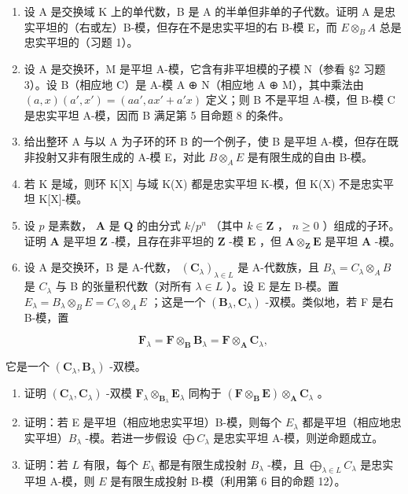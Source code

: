 \begin{enumerate}
\def\labelenumi{\arabic{enumi}.}
\setcounter{enumi}{3}
\item
设 A 是交换域 K 上的单代数，B 是 A 的半单但非单的子代数。证明 A 是忠实平坦的（右或左）B-模，但存在不是忠实平坦的右 B-模 E，而 \(E \otimes_{B} A\) 总是忠实平坦的（习题 1）。
\item
设 A 是交换环，M 是平坦 A-模，它含有非平坦模的子模 N（参看 §2 习题 3）。设 B（相应地 C）是 A-模 A ⊕ N（相应地 A ⊕ M），其中乘法由 \((a, x)(a', x') = (aa', ax' + a'x)\) 定义；则 B 不是平坦 A-模，但 B-模 C 是忠实平坦 A-模，因而 B 满足第 5 目命题 8 的条件。
\item
给出整环 A 与以 A 为子环的环 B 的一个例子，使 B 是平坦 A-模，但存在既非投射又非有限生成的 A-模 E，对此 \(B \otimes_{A} E\) 是有限生成的自由 B-模。
\item
若 K 是域，则环 K{[}X{]} 与域 K(X) 都是忠实平坦 K-模，但 K(X) 不是忠实平坦 K{[}X{]}-模。
\item
设 \(p\) 是素数， \(\mathbf{A}\) 是 \(\mathbf{Q}\) 的由分式 \(k / p^n\) （其中 \(k \in \mathbf{Z}\) ， \(n \geqslant 0\) ）组成的子环。证明 \(\mathbf{A}\) 是平坦 \(\mathbf{Z}\) -模，且存在非平坦的 \(\mathbf{Z}\) -模 \(\mathbf{E}\) ，但 \(\mathbf{A} \otimes_{\mathbf{Z}} \mathbf{E}\) 是平坦 \(\mathbf{A}\) -模。
\item
设 A 是交换环，B 是 A-代数， \((\mathbf{C}_{\lambda})_{\lambda \in L}\) 是 A-代数族，且 \(B_{\lambda} = C_{\lambda} \otimes_{A} B\) 是 \(C_{\lambda}\) 与 B 的张量积代数（对所有 \(\lambda \in L\) ）。设 E 是左 B-模。置 \(E_{\lambda} = B_{\lambda} \otimes_{B} E = C_{\lambda} \otimes_{A} E\) ；这是一个 \((\mathbf{B}_{\lambda}, \mathbf{C}_{\lambda})\) -双模。类似地，若 F 是右 B-模，置
\end{enumerate}

\[
\mathbf {F} _ {\lambda} = \mathbf {F} \otimes_ {\mathbf {B}} \mathbf {B} _ {\lambda} = \mathbf {F} \otimes_ {\mathbf {A}} \mathbf {C} _ {\lambda},
\]

它是一个 \((\mathbf{C}_{\lambda},\mathbf{B}_{\lambda})\) -双模。

\begin{enumerate}
\def\labelenumi{(\alph{enumi})}
\item
证明 \((\mathbf{C}_{\lambda},\mathbf{C}_{\lambda})\) -双模 \(\mathbf{F}_{\lambda}\otimes_{\mathbf{B}_{\lambda}}\mathbf{E}_{\lambda}\) 同构于 \((\mathbf{F}\otimes_{\mathbf{B}}\mathbf{E})\otimes_{\mathbf{A}}\mathbf{C}_{\lambda}\) 。
\item
证明：若 E 是平坦（相应地忠实平坦）B-模，则每个 \(E_{\lambda}\) 都是平坦（相应地忠实平坦）\(B_{\lambda}\) -模。若进一步假设 \(\bigoplus C_{\lambda}\) 是忠实平坦 A-模，则逆命题成立。
\item
证明：若 \(L\) 有限，每个 \(E_{\lambda}\) 都是有限生成投射 \(B_{\lambda}\) -模，且 \(\bigoplus_{\lambda \in L} C_{\lambda}\) 是忠实平坦 A-模，则 \(E\) 是有限生成投射 B-模（利用第 6 目的命题 12）。
\end{enumerate}

